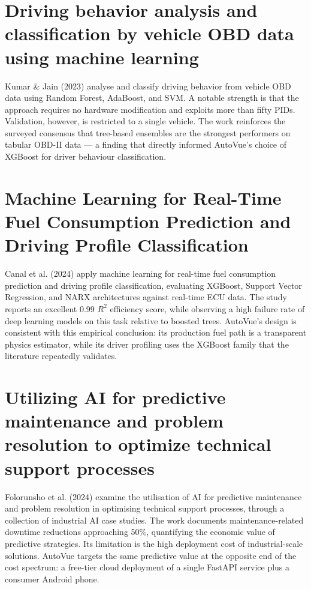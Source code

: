 \documentclass[10pt,a4paper]{report}
\begin{document}
\section{Driving behavior analysis and classification by vehicle OBD data using machine learning}

Kumar \& Jain (2023) \cite{article8} analyse and classify driving behavior from vehicle OBD data using Random Forest, AdaBoost, and SVM. A notable strength is that the approach requires no hardware modification and exploits more than fifty PIDs. Validation, however, is restricted to a single vehicle. The work reinforces the surveyed consensus that tree-based ensembles are the strongest performers on tabular OBD-II data — a finding that directly informed AutoVue's choice of XGBoost for driver behaviour classification.

\section{Machine Learning for Real-Time Fuel Consumption Prediction and Driving Profile Classification}

Canal et al. (2024) \cite{article9} apply machine learning for real-time fuel consumption prediction and driving profile classification, evaluating XGBoost, Support Vector Regression, and NARX architectures against real-time ECU data. The study reports an excellent 0.99 $R^2$ efficiency score, while observing a high failure rate of deep learning models on this task relative to boosted trees. AutoVue's design is consistent with this empirical conclusion: its production fuel path is a transparent physics estimator, while its driver profiling uses the XGBoost family that the literature repeatedly validates.

\section{Utilizing AI for predictive maintenance and problem resolution to optimize technical support processes}

Folorunsho et al. (2024) \cite{article10} examine the utilisation of AI for predictive maintenance and problem resolution in optimising technical support processes, through a collection of industrial AI case studies. The work documents maintenance-related downtime reductions approaching 50\%, quantifying the economic value of predictive strategies. Its limitation is the high deployment cost of industrial-scale solutions. AutoVue targets the same predictive value at the opposite end of the cost spectrum: a free-tier cloud deployment of a single FastAPI service plus a consumer Android phone.
\end{document}

